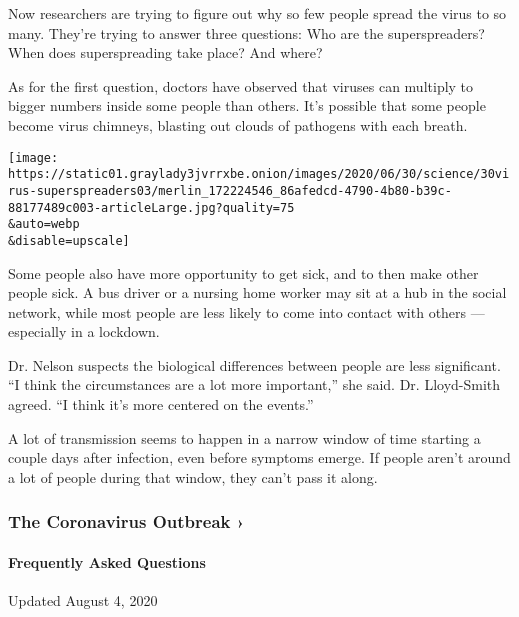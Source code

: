 Now researchers are trying to figure out why so few people spread the
virus to so many. They're trying to answer three questions: Who are the
superspreaders? When does superspreading take place? And where?

As for the first question, doctors have observed that viruses can
multiply to bigger numbers inside some people than others. It's possible
that some people become virus chimneys, blasting out clouds of pathogens
with each breath.

\texttt{[image: https://static01.graylady3jvrrxbe.onion/images/2020/06/30/science/30virus-superspreaders03/merlin\_172224546\_86afedcd-4790-4b80-b39c-88177489c003-articleLarge.jpg?quality=75\\\&auto=webp\\\&disable=upscale]}

Some people also have more opportunity to get sick, and to then make
other people sick. A bus driver or a nursing home worker may sit at a
hub in the social network, while most people are less likely to come
into contact with others --- especially in a lockdown.

Dr. Nelson suspects the biological differences between people are less
significant. ``I think the circumstances are a lot more important,'' she
said. Dr. Lloyd-Smith agreed. ``I think it's more centered on the
events.''

A lot of transmission seems to happen in a narrow window of time
starting a couple days after infection, even before symptoms emerge. If
people aren't around a lot of people during that window, they can't pass
it along.

\href{https://www.nytimes3xbfgragh.onion/news-event/coronavirus?action=click\&pgtype=Article\&state=default\&region=MAIN_CONTENT_3\&context=storylines_faq}{}

\hypertarget{the-coronavirus-outbreak-}{%
\subsubsection{The Coronavirus Outbreak
›}\label{the-coronavirus-outbreak-}}

\hypertarget{frequently-asked-questions}{%
\paragraph{Frequently Asked
Questions}\label{frequently-asked-questions}}

Updated August 4, 2020

